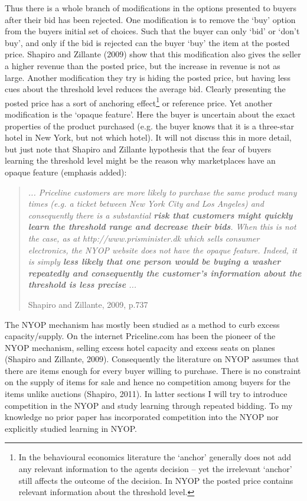 \documentclass[a4paper,12pt]{article}
\begin{document}
	Thus there is a whole branch of modifications in the options presented to buyers after their bid has been rejected. One modification is to remove the `buy' option from the buyers initial set of choices. Such that the buyer can only `bid' or `don't buy', and only if the bid is rejected can the buyer `buy' the item at the posted price. Shapiro and Zillante (2009) show that this modification also gives the seller a higher revenue than the posted price, but the increase in revenue is not as large. Another modification they try is hiding the posted price, but having less cues about the threshold level reduces the average bid. Clearly presenting the posted price has a sort of anchoring effect\footnote{In the behavioural economics literature the `anchor' generally does not add any relevant information to the agents decision -- yet the irrelevant `anchor' still affects the outcome of the decision. In NYOP the posted price contains relevant information about the threshold level.} or reference price. Yet another modification is the `opaque feature'. Here the buyer is uncertain about the exact properties of the product purchased (e.g. the buyer knows that it is a three-star hotel in New York, but not which hotel). It will not discuss this in more detail, but just note that Shapiro and Zillante hypothesis that the fear of buyers learning the threshold level might be the reason why marketplaces have an opaque feature (emphasis added):
	\blockquote[Shapiro and Zillante, 2009, p.737]{\emph{ ... Priceline customers are more likely to purchase the same product many times (e.g. a ticket between New York City and Los Angeles) and consequently there is a substantial \emph{\bf risk that customers might quickly learn the threshold range and decrease their bids}. When this is not the case, as at http://www.prisminister.dk which sells consumer electronics, the NYOP website does not have the opaque feature. Indeed, it is simply \emph{\bf less likely that one person would be buying a washer repeatedly and consequently the customer's information about the threshold is less precise} ...}}

	The NYOP mechanism has mostly been studied as a method to curb excess capacity/supply. On the internet Priceline.com has been the pioneer of the NYOP mechanism, selling excess hotel capacity and excess seats on planes (Shapiro and Zillante, 2009). Consequently the literature on NYOP assumes that there are items enough for every buyer willing to purchase. There is no constraint on the supply of items for sale and hence no competition among buyers for the items unlike auctions (Shapiro, 2011). In latter sections I will try to introduce competition in the NYOP and study learning through repeated bidding. To my knowledge no prior paper has incorporated competition into the NYOP nor explicitly studied learning in NYOP.
\end{document}
